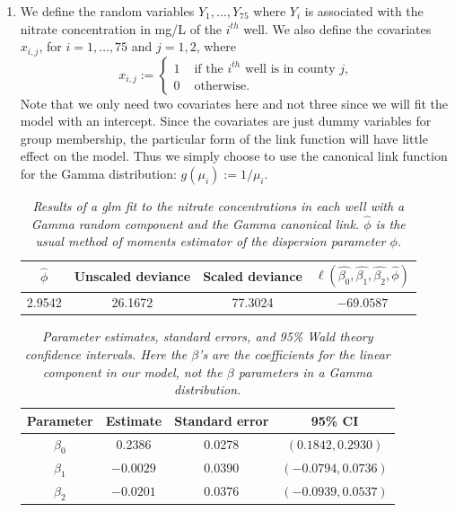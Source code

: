 \documentclass[12pt]{article}
\begin{document}
\newpage

\begin{enumerate}
  \item We define the random variables $Y_{1}, \dots, Y_{75}$ where $Y_{i}$ is associated with the nitrate concentration in mg/L of the $i^{th}$ well.
    We also define the covariates $x_{i,j}$, for $i = 1,
    \hdots, 75$ and $j = 1,2$, where
    \[
      x_{i,j} := \left\{ \begin{array}{cl}
          1 & \text{ if the $i^{th}$ well is in county $j$,} \\
          0 & \text{ otherwise}.
      \end{array} \right.
    \]
    Note that we only need two covariates here and not three since we will fit the model with an intercept.
    Since the covariates are just dummy variables for group membership, the particular form of the link function will have little effect on the model.
    Thus we simply choose to use the canonical link function for the Gamma distribution: $g(\mu_i) := 1 / \mu_i$.
    

    \begin{table}[h]
      \caption{\emph{Results of a glm fit to the nitrate concentrations in each well with a Gamma random component and the Gamma canonical link.
      $\hat{\phi}$ is the usual method of moments estimator of the dispersion parameter $\phi$.}}
      \vspace{.5cm}
      \centering
      \begin{tabular}{|c|c|c|c|}
        \hline
        $\hat{\phi}$ & Unscaled deviance & Scaled deviance & $\ell(\hat{\beta_0}, \hat{\beta_1}, \hat{\beta_2}, \hat{\phi})$ \\
        \hline
        2.9542 & 26.1672 & 77.3024 & $-69.0587$ \\
        \hline
      \end{tabular}
      \label{tab:1}
    \end{table}


    \begin{table}[h]
      \caption{\emph{Parameter estimates, standard errors, and 95\% Wald theory confidence intervals. Here the $\beta$'s are the coefficients for the
      linear component in our model, not the $\beta$ parameters in a Gamma distribution.}}
      \vspace{.5cm}
      \centering
      \begin{tabular}{|c|c|c|c|}
        \hline
        Parameter & Estimate & Standard error & 95\% CI \\
        \hline
        $\beta_0$ & 0.2386 & 0.0278 & $(0.1842,0.2930)$ \\
        \hline
        $\beta_1$ & $-0.0029$ & 0.0390 & $(-0.0794, 0.0736)$ \\
        \hline
        $\beta_2$ & $-0.0201$ & 0.0376 & $(-0.0939, 0.0537)$ \\
        \hline
      \end{tabular}
      \label{tab:2}
    \end{table}


\end{enumerate}
\end{document}
